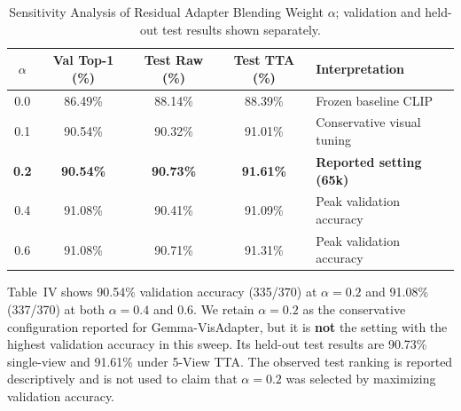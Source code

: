 \documentclass[conference]{IEEEtran}
\begin{document}
\begin{table}[b]
\centering
\caption{Sensitivity Analysis of Residual Adapter Blending Weight \textbf{\boldmath $\alpha$}; validation and held-out test results shown separately.}
\label{tab:alpha_ablation}
\vspace{2pt}
\footnotesize
\setlength{\tabcolsep}{2.5pt}
\renewcommand{\arraystretch}{1.05}
\begin{tabularx}{\columnwidth}{c c c c >{\raggedright\arraybackslash}X}
\toprule
\textbf{\boldmath $\alpha$} & \textbf{Val Top-1 (\%)} & \textbf{Test Raw (\%)} & \textbf{Test TTA (\%)} & \textbf{Interpretation} \\
\midrule
0.0 & 86.49\% & 88.14\% & 88.39\% & Frozen baseline CLIP \\
0.1 & 90.54\% & 90.32\% & 91.01\% & Conservative visual tuning \\
\textbf{0.2} & \textbf{90.54\%} & \textbf{90.73\%} & \textbf{91.61\%} & \textbf{Reported setting (65k)} \\
0.4 & 91.08\% & 90.41\% & 91.09\% & Peak validation accuracy \\
0.6 & 91.08\% & 90.71\% & 91.31\% & Peak validation accuracy \\
\bottomrule
\end{tabularx}
\end{table}

Table~IV shows 90.54\% validation accuracy (335/370) at $\alpha=0.2$ and 91.08\% (337/370) at both $\alpha=0.4$ and $0.6$. We retain $\alpha=0.2$ as the conservative configuration reported for Gemma-VisAdapter, but it is \textbf{not} the setting with the highest validation accuracy in this sweep. Its held-out test results are 90.73\% single-view and 91.61\% under 5-View TTA. The observed test ranking is reported descriptively and is not used to claim that $\alpha=0.2$ was selected by maximizing validation accuracy.
\end{document}
